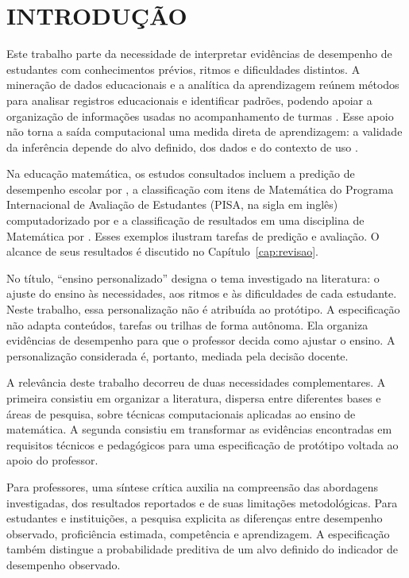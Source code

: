 \chapter{INTRODUÇÃO}
\label{cap:introducao}

Este trabalho parte da necessidade de interpretar evidências de desempenho de estudantes com conhecimentos prévios, ritmos e dificuldades distintos. A mineração de dados educacionais e a analítica da aprendizagem reúnem métodos para analisar registros educacionais e identificar padrões, podendo apoiar a organização de informações usadas no acompanhamento de turmas \cite{Romero2020}. Esse apoio não torna a saída computacional uma medida direta de aprendizagem: a validade da inferência depende do alvo definido, dos dados e do contexto de uso \cite{NRC2001}.

Na educação matemática, os estudos consultados incluem a predição de desempenho escolar por , a classificação com itens de Matemática do Programa Internacional de Avaliação de Estudantes (PISA, na sigla em inglês) computadorizado por  e a classificação de resultados em uma disciplina de Matemática por . Esses exemplos ilustram tarefas de predição e avaliação. O alcance de seus resultados é discutido no Capítulo~\ref{cap:revisao}.

No título, ``ensino personalizado'' designa o tema investigado na literatura: o ajuste do ensino às necessidades, aos ritmos e às dificuldades de cada estudante. Neste trabalho, essa personalização não é atribuída ao protótipo. A especificação não adapta conteúdos, tarefas ou trilhas de forma autônoma. Ela organiza evidências de desempenho para que o professor decida como ajustar o ensino. A personalização considerada é, portanto, mediada pela decisão docente.

A relevância deste trabalho decorreu de duas necessidades complementares. A primeira consistiu em organizar a literatura, dispersa entre diferentes bases e áreas de pesquisa, sobre técnicas computacionais aplicadas ao ensino de matemática. A segunda consistiu em transformar as evidências encontradas em requisitos técnicos e pedagógicos para uma especificação de protótipo voltada ao apoio do professor.

Para professores, uma síntese crítica auxilia na compreensão das abordagens investigadas, dos resultados reportados e de suas limitações metodológicas. Para estudantes e instituições, a pesquisa explicita as diferenças entre desempenho observado, proficiência estimada, competência e aprendizagem. A especificação também distingue a probabilidade preditiva de um alvo definido do indicador de desempenho observado.

